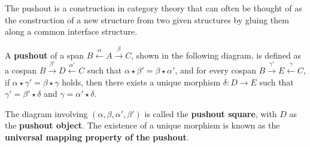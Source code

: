 The pushout is a construction in category theory that can often be thought of as the construction of a new structure from two given structures by gluing them along a common interface structure.
\begin{definition}
    \label{def:cat:po} 
    A \textbf{pushout} of a span \( B \overset{\alpha}{\leftarrow} A \overset{\beta}{\rightarrow} C \), shown in the following diagram,
    is defined as a cospan \( B \overset{\beta'}{\rightarrow} D \overset{\alpha'}{\leftarrow} C \) such that \( \alpha \mathop{\star} \beta' \mathop{=} \beta \mathop{\star} \alpha' \), and for every cospan \( B \overset{\gamma'}{\rightarrow} E \overset{\gamma}{\leftarrow} C \), if \( \alpha \mathop{\star} \gamma' \mathop{=} \beta \mathop{\star} \gamma \) holds, then there exists a unique morphism \(\delta : D  \mathop{\to} E\) such that \( \gamma' \mathop{=} \beta' \mathop{\star} \delta \) and \( \gamma \mathop{=} \alpha' \mathop{\star} \delta \).
    \begin{center}
            \end{center}
The diagram involving \( (\alpha, \beta, \alpha', \beta') \) is called the \textbf{pushout square}, with \(D\) as the \textbf{pushout object}. The existence of a unique morphism is known as the \textbf{universal mapping property of the pushout}.
\end{definition} 

